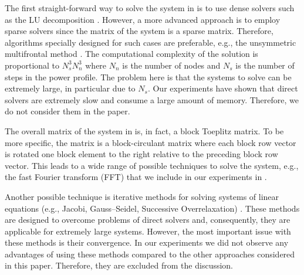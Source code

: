 The first straight-forward way to solve the system in  is to use dense solvers such as the LU decomposition \cite{press2007}. However, a more advanced approach is to employ sparse solvers since the matrix of the system is a sparse matrix. Therefore, algorithms specially designed for such cases are preferable, e.g., the unsymmetric multifrontal method . The computational complexity of the solution is proportional to $N_s^3 N_n^3$ \cite{press2007} where $N_n$ is the number of nodes and $N_s$ is the number of steps in the power profile. The problem here is that the systems to solve can be extremely large, in particular due to $N_s$. Our experiments have shown that direct solvers are extremely slow and consume a large amount of memory. Therefore, we do not consider them in the paper.

The overall matrix of the system in  is, in fact, a block Toeplitz matrix. To be more specific, the matrix is a block-circulant matrix where each block row vector is rotated one block element to the right relative to the preceding block row vector. This leads to a wide range of possible techniques to solve the system, e.g., the fast Fourier transform (FFT)  that we include in our experiments in .

Another possible technique is iterative methods for solving systems of linear equations (e.g., Jacobi, Gauss--Seidel, Successive Overrelaxation) \cite{press2007}. These methods are designed to overcome problems of direct solvers and, consequently, they are applicable for extremely large systems. However, the most important issue with these methods is their convergence. In our experiments we did not observe any advantages of using these methods compared to the other approaches considered in this paper. Therefore, they are excluded from the discussion.
